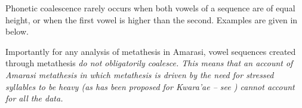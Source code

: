 \begin{exe}
	\label{ex:/V.V/->[V.V]}
\end{exe}

Phonetic coalescence rarely occurs when both vowels
of a sequence are of equal height,
or when the first vowel is higher than the second.
Examples are given in  below.

\newpage
\begin{exe}
	\label{ex:/V.V/->[V.V]2}
\end{exe}

Importantly for any analysis of metathesis in Amarasi,
vowel sequences created through metathesis \it{do not} obligatorily coalesce.
This means that an account of Amarasi metathesis
in which metathesis is driven by the need for stressed syllables to be heavy
(as has been proposed for Kwara'ae -- see )
cannot account for all the data.

